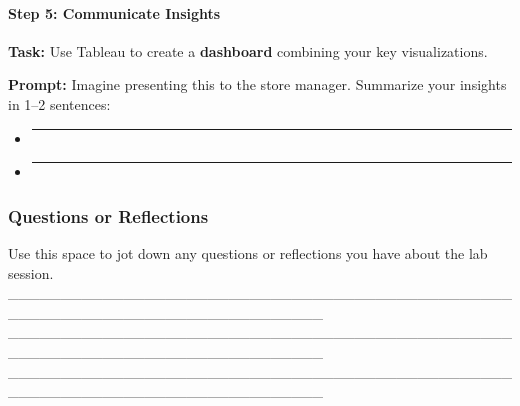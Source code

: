\documentclass[
  11pt,
]{article}
\begin{document}
\paragraph{Step 5: Communicate
Insights}\label{step-5-communicate-insights}

\textbf{Task:} Use Tableau to create a \textbf{dashboard} combining your
key visualizations.

\textbf{Prompt:} Imagine presenting this to the store manager. Summarize
your insights in 1--2 sentences:

\begin{itemize}
\item
  \begin{center}\rule{0.5\linewidth}{0.5pt}\end{center}
\item
  \begin{center}\rule{0.5\linewidth}{0.5pt}\end{center}
\end{itemize}

\subsubsection{Questions or Reflections}\label{questions-or-reflections}

Use this space to jot down any questions or reflections you have about
the lab session.
\_\_\_\_\_\_\_\_\_\_\_\_\_\_\_\_\_\_\_\_\_\_\_\_\_\_\_\_\_\_\_\_\_\_\_\_\_\_\_\_\_\_\_\_\_\_\_\_\_\_\_\_\_\_\_\_\_\_\_\_\_\_\_\_\_\_\_\_\_\_\_\_\_\_\_\_\_\_
\_\_\_\_\_\_\_\_\_\_\_\_\_\_\_\_\_\_\_\_\_\_\_\_\_\_\_\_\_\_\_\_\_\_\_\_\_\_\_\_\_\_\_\_\_\_\_\_\_\_\_\_\_\_\_\_\_\_\_\_\_\_\_\_\_\_\_\_\_\_\_\_\_\_\_\_\_\_
\_\_\_\_\_\_\_\_\_\_\_\_\_\_\_\_\_\_\_\_\_\_\_\_\_\_\_\_\_\_\_\_\_\_\_\_\_\_\_\_\_\_\_\_\_\_\_\_\_\_\_\_\_\_\_\_\_\_\_\_\_\_\_\_\_\_\_\_\_\_\_\_\_\_\_\_\_\_
\end{document}
